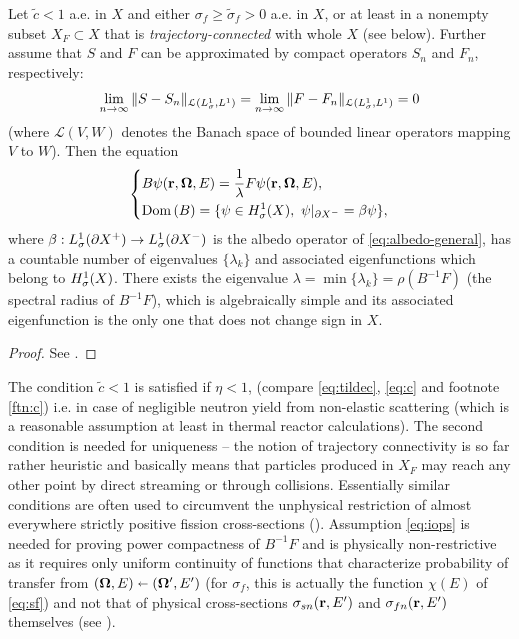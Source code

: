 \begin{theorem}\label{thm:eigenvalue}
	Let $\tilde{c} < 1$ a.e. in $X$ and either $\sigma_f \geq \tilde{\sigma}_f > 0$ a.e. in $X$, or at least in a nonempty
	subset $X_F \subset X$ that is \textit{trajectory-connected} with whole $X$ (see below). 
	Further assume that $S$ and $F$ can be approximated by compact operators $S_n$ and $F_n$, respectively:
\begin{equation}\label{eq:iops}
	\lim_{n\to\infty}\Vert S-S_n\Vert_{\mathcal{L}(\Lp[1]_{\sigma},\Lp[1])} = 
	\lim_{n\to\infty}\Vert F-F_n\Vert_{\mathcal{L}(\Lp[1]_{\sigma},\Lp[1])} = 0
\end{equation}
(where $\mathcal{L}(V,W)$  denotes the Banach space of bounded linear operators mapping $V$ to
$W$).
Then the equation
\begin{equation*}
\left\{
  \begin{aligned}
     &B\psi(\br,\bomega,E) = \frac{1}{\lambda} F\psi(\br,\bomega,E),\\
     &\Dom{B} = \{\psi\in \Hp[1]_{\sigma}(X),\ \psi\vert_{\pX[-]} = \beta\psi\},
  \end{aligned}
\right.
\end{equation*}
where $\beta : \Lp[1]_{\sigma}(\pX[+]) \to \Lp[1]_{\sigma}(\pX[-])$ is the albedo operator of
\eqref{eq:albedo-general}, has a countable number of eigenvalues $\{\lambda_k\}$ and associated eigenfunctions which
belong to $\Hp[1]_{\sigma}(X)$.
There exists the eigenvalue $\lambda = \min \{\lambda_k\} = \rho(B^{-1}F)$ (the spectral radius of $B^{-1}F$), which is
algebraically simple and its associated eigenfunction is the only one that does not change sign in $X$.
\end{theorem}
\begin{proof}
See \cite{Sanchez3}.
\end{proof}
The condition $\tilde{c} < 1$ is satisfied if $\eta < 1$, (compare \eqref{eq:tildec}, \eqref{eq:c} and footnote
\ref{ftn:c}) i.e. in case of negligible neutron yield from non-elastic scattering (which is a reasonable assumption at
least in thermal reactor calculations). The second condition is needed for uniqueness -- the notion of trajectory
connectivity is so far rather heuristic and basically means that particles produced in $X_F$ may reach any other point 
by direct streaming or through collisions. Essentially similar conditions are often used to circumvent the
unphysical restriction of almost everywhere strictly positive fission cross-sections 
(\cite{MokhtarKharroubi,AllaireHomogenization}). Assumption \eqref{eq:iops} is needed for proving power compactness of
$B^{-1}F$ and is physically non-restrictive as it requires only uniform continuity of functions that
characterize probability of transfer from $(\bomega, E) \sla (\bomega',E')$ (for $\sigma_f$, this is actually the
function $\chi(E)$ of \eqref{eq:sf}) and not that of physical cross-sections $\sigma_{sn}(\br,E')$ and
$\sigma_{fn}(\br,E')$ themselves (see \cite{Sanchez3}).

